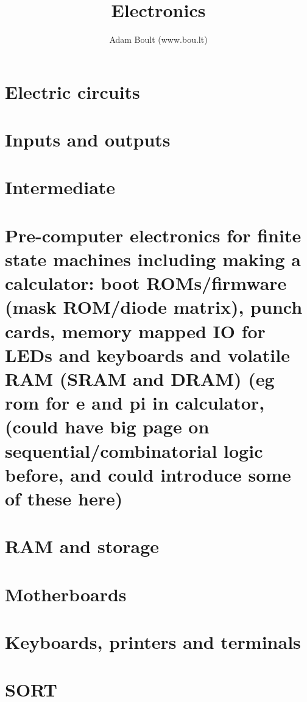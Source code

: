 \documentclass[oneside]{book}
\begin{document}
\author{Adam Boult (www.bou.lt)}
\title{Electronics}
\maketitle

\setcounter{tocdepth}{0}
\tableofcontents



\part{Electric circuits}





\part{Inputs and outputs}







\part{Intermediate}



\part{Pre-computer electronics for finite state machines including making a calculator: boot ROMs/firmware (mask ROM/diode matrix), punch cards, memory mapped IO for LEDs and keyboards and volatile RAM (SRAM and DRAM) (eg rom for e and pi in calculator, (could have big page on sequential/combinatorial logic before, and could introduce some of these here)}

\part{RAM and storage}

\part{Motherboards}

\part{Keyboards, printers and terminals}

\part{SORT}

\end{document}
